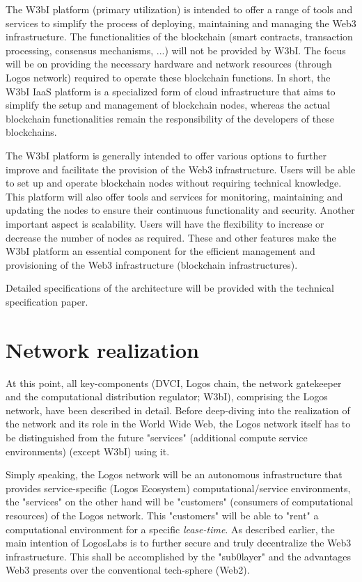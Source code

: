\documentclass[]{article}
\begin{document}
The W3bI platform (primary utilization) is intended to offer a range of tools and services to simplify the process of deploying, maintaining and managing the Web3 infrastructure.
The functionalities of the blockchain (smart contracts, transaction processing, consensus mechanisms, ...) will not be provided by W3bI.   
The focus will be on providing the necessary hardware and network resources (through Logos network) required to operate these blockchain functions.
In short, the W3bI IaaS platform is a specialized form of cloud infrastructure that aims to simplify the setup and management of blockchain nodes, whereas the actual blockchain functionalities remain the responsibility of the developers of these blockchains.

The W3bI platform is generally intended to offer various options to further improve and facilitate the provision of the Web3 infrastructure.
Users will be able to set up and operate blockchain nodes without requiring technical knowledge. 
This platform will also offer tools and services for monitoring, maintaining and updating the nodes to ensure their continuous functionality and security. 
Another important aspect is scalability. 
Users will have the flexibility to increase or decrease the number of nodes as required.
These and other features make the W3bI platform an essential component for the efficient management and provisioning of the Web3 infrastructure (blockchain infrastructures).

Detailed specifications of the architecture will be provided with the technical specification paper.

\section{Network realization}
At this point, all key-components (DVCI, Logos chain, the network gatekeeper and the computational distribution regulator; W3bI), comprising the Logos network, have been described in detail. 
Before deep-diving into the realization of the network and its role in the World Wide Web, the Logos network itself has to be distinguished from the future "services" (additional compute service environments) (except W3bI) using it. 

Simply speaking, the Logos network will be an autonomous infrastructure that provides service-specific (Logos Ecosystem) computational/service environments, the "services" on the other hand will be "customers" (consumers of computational resources) of the Logos network.
This "customers" will be able to "rent" a computational environment for a specific \textit{lease-time}.
As described earlier, the main intention of LogosLabs is to further secure and truly decentralize the Web3 infrastructure. 
This shall be accomplished by the "sub0layer" and the advantages Web3 presents over the conventional tech-sphere (Web2).
\end{document}

